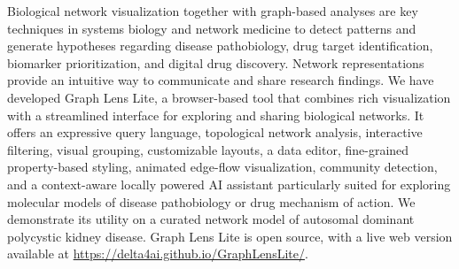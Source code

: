 Biological network visualization together with graph-based analyses are key techniques in systems biology and network medicine to detect patterns and generate hypotheses regarding disease pathobiology, drug target identification, biomarker prioritization, and digital drug discovery. Network representations provide an intuitive way to communicate and share research findings. We have developed Graph Lens Lite, a browser-based tool that combines rich visualization with a streamlined interface for exploring and sharing biological networks. It offers an expressive query language, topological network analysis, interactive filtering, visual grouping, customizable layouts, a data editor, fine-grained property-based styling, animated edge-flow visualization, community detection, and a context-aware locally powered AI assistant particularly suited for exploring molecular models of disease pathobiology or drug mechanism of action. We demonstrate its utility on a curated network model of autosomal dominant polycystic kidney disease. Graph Lens Lite is open source, with a live web version available at \url{https://delta4ai.github.io/GraphLensLite/}.
